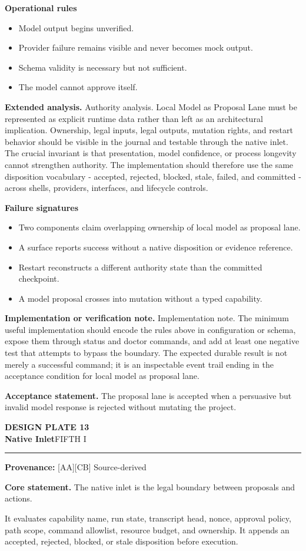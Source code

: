 \documentclass[10pt,letterpaper,oneside]{article}
\newcommand{\prov}[1]{\textcolor{gardenBlue}{\sffamily\footnotesize\textbf{Provenance:} #1}}
\newcommand{\platetitle}[3]{%
  \begin{minipage}[t][0.54in][t]{\textwidth}
  {\sffamily\bfseries\color{gardenDeep}\fontsize{9}{10}\selectfont DESIGN PLATE #1}\\[-1pt]
  {\sffamily\bfseries\color{gardenInk}\fontsize{16.5}{18}\selectfont #2}\hfill{\sffamily\color{gardenGreen}\large #3}
  \end{minipage}\vspace{-2pt}\hrule\vspace{5pt}}
\begin{document}
\textbf{Operational rules}
\begin{itemize}
\item Model output begins unverified.
\item Provider failure remains visible and never becomes mock output.
\item Schema validity is necessary but not sufficient.
\item The model cannot approve itself.
\end{itemize}
\textbf{Extended analysis.} Authority analysis. Local Model as Proposal Lane must be represented as explicit runtime data rather than left as an architectural implication. Ownership, legal inputs, legal outputs, mutation rights, and restart behavior should be visible in the journal and testable through the native inlet. The crucial invariant is that presentation, model confidence, or process longevity cannot strengthen authority. The implementation should therefore use the same disposition vocabulary - accepted, rejected, blocked, stale, failed, and committed - across shells, providers, interfaces, and lifecycle controls.

\textbf{Failure signatures}
\begin{itemize}
\item Two components claim overlapping ownership of local model as proposal lane.
\item A surface reports success without a native disposition or evidence reference.
\item Restart reconstructs a different authority state than the committed checkpoint.
\item A model proposal crosses into mutation without a typed capability.
\end{itemize}
\textbf{Implementation or verification note.} Implementation note. The minimum useful implementation should encode the rules above in configuration or schema, expose them through status and doctor commands, and add at least one negative test that attempts to bypass the boundary. The expected durable result is not merely a successful command; it is an inspectable event trail ending in the acceptance condition for local model as proposal lane.

\begin{acceptbox}
\textbf{Acceptance statement.} The proposal lane is accepted when a persuasive but invalid model response is rejected without mutating the project.
\end{acceptbox}
\newpage
\platetitle{13}{Native Inlet}{FIFTH I}
\prov{[AA][CB] Source-derived}
\fontsize{8.85}{10.45}\selectfont
\begin{corebox}
\textbf{Core statement.} The native inlet is the legal boundary between proposals and actions.
\end{corebox}
It evaluates capability name, run state, transcript head, nonce, approval policy, path scope, command allowlist, resource budget, and ownership. It appends an accepted, rejected, blocked, or stale disposition before execution.
\end{document}
